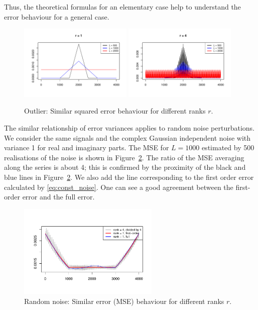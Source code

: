 \documentclass[engproc, submit, article,pdftex,moreauthors]{Definitions/mdpi}
\begin{document}
Thus, the theoretical formulas for an elementary case help to understand the error behaviour for a general case. 

\begin{figure}[!htb]
    \centering
        \includegraphics[width=0.48\textwidth]{img/const_outl_err_1}
        \includegraphics[width=0.48\textwidth]{img/const_outl_err_4}
    \caption{Outlier: Similar squared error behaviour for different ranks $r$.}
    \label{fig:outlier}
\end{figure}

The similar relationship of error variances applies to random noise perturbations. We consider the same signals and the complex Gaussian independent noise with variance 1 for real and imaginary parts. The MSE for $L=1000$ estimated by 500 realisations of the noise is shown in Figure~\ref{fig:noise}. The ratio of the MSE averaging along the series is about 4; this is confirmed by the proximity of the black and blue lines in Figure~\ref{fig:noise}. We also add the line corresponding to the first order error calculated by \eqref{eq:const_noise}. One can see a good agreement between the first-order error and the full error.

\begin{figure}[!htb]
    \centering
        \includegraphics[width=0.6\textwidth]{img/const_noise_err_14}
    \caption{Random noise: Similar error (MSE) behaviour for different ranks $r$.}
    \label{fig:noise}
\end{figure}
\end{document}
